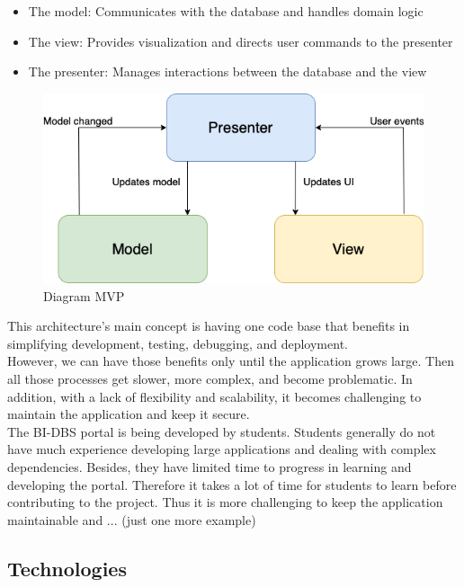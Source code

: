 \begin{itemize}
  \item The model: Communicates with the database and handles domain logic
  \item The view: Provides visualization and directs user commands to the presenter
  \item The presenter: Manages interactions between the database and the view
\end{itemize}

\begin{figure}[h]
\includegraphics[width=\textwidth]{../png/mvp.png}
\caption{Diagram MVP}\label{picture:mvp}
\end{figure}

\noindent
This architecture's main concept is having one code base that benefits in simplifying development, testing, debugging, and deployment. \\
However, we can have those benefits only until the application grows large. Then all those processes get slower, more complex, and become problematic. In addition, with a lack of flexibility and scalability, it becomes challenging to maintain the application and keep it secure. \\

\noindent The BI-DBS portal is being developed by students. Students generally do not have much experience developing large applications and dealing with complex dependencies. Besides, they have limited time to progress in learning and developing the portal. Therefore it takes a lot of time for students to learn before contributing to the project. Thus it is more challenging to keep the application maintainable and ... (just one more example)


\subsection{Technologies}
